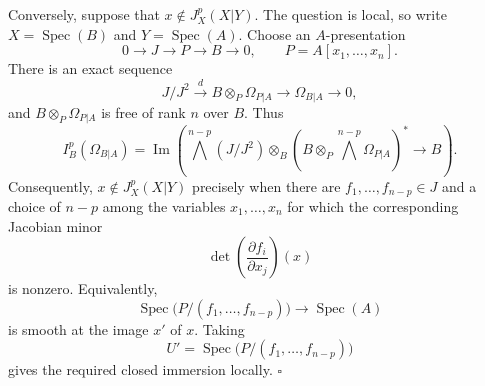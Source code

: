 
Conversely, suppose that $x\notin J_X^p(X|Y)$. The question is
local, so write $X=\operatorname{Spec}(B)$ and
$Y=\operatorname{Spec}(A)$. Choose an $A$-presentation
\[
0\longrightarrow J\longrightarrow P\longrightarrow B
\longrightarrow0,
\qquad P=A[x_1,\ldots,x_n].
\]
There is an exact sequence
\[
J/J^2\xrightarrow{d}B\otimes_P\Omega_{P|A}
\longrightarrow\Omega_{B|A}\longrightarrow0,
\]
and $B\otimes_P\Omega_{P|A}$ is free of rank $n$ over $B$. Thus
\[
I_B^p(\Omega_{B|A})
=\operatorname{Im}\left(
 \bigwedge^{n-p}(J/J^2)\otimes_B
 (B\otimes_P\bigwedge^{n-p}\Omega_{P|A})^*
 \longrightarrow B\right).
\]
Consequently, $x\notin J_X^p(X|Y)$ precisely when there are
$f_1,\ldots,f_{n-p}\in J$ and a choice of $n-p$ among the variables
$x_1,\ldots,x_n$ for which the corresponding Jacobian minor
\[
\det\left(\frac{\partial f_i}{\partial x_j}\right)(x)
\]
is nonzero. Equivalently,
\[
\operatorname{Spec}\bigl(P/(f_1,\ldots,f_{n-p})\bigr)
\longrightarrow\operatorname{Spec}(A)
\]
is smooth at the image $x'$ of $x$. Taking
\[
U'=\operatorname{Spec}\bigl(P/(f_1,\ldots,f_{n-p})\bigr)
\]
gives the required closed immersion locally. \hfill$\square$

